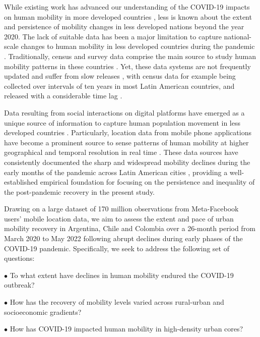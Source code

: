 \documentclass[fleqn,10pt]{wlscirep}
\begin{document}
While existing work has advanced our understanding of the COVID-19 impacts on human mobility in more developed countries \cite{gonzález-leonardo2022b, roweCalafiore2022, rowe2023, wang2022}, less is known about the extent and persistence of mobility changes in less developed nations beyond the year 2020. The lack of suitable data has been a major limitation to capture national-scale changes to human mobility in less developed countries during the pandemic \cite{ RoweCCA24}. Traditionally, census and survey data comprise the main source to study human mobility patterns in these countries \cite{bell2014}. Yet, these data systems are not frequently updated and suffer from slow releases \cite{rowe2023big, Cabrera-Arnau2023}, with census data for example being collected over intervals of ten years in most Latin American countries, and released with a considerable time lag \cite{bell2014}. 

Data resulting from social interactions on digital platforms have emerged as a unique source of information to capture human population movement in less developed countries \cite{rowe2023big}. Particularly, location data from mobile phone applications have become a prominent source to sense patterns of human mobility at higher geographical and temporal resolution in real time \cite{calafiore2023, iradukunda2025}. These data sources have consistently documented the sharp and widespread mobility declines during the early months of the pandemic across Latin American cities \cite{RoweCCA24, covidMexico24, elejalde2024, demography25}, providing a well-established empirical foundation for focusing on the persistence and inequality of the post-pandemic recovery in the present study.

Drawing on a large dataset of 170 million observations from Meta-Facebook users' mobile location data, we aim to assess the extent and pace of urban mobility recovery in Argentina, Chile and Colombia over a 26-month period from March 2020 to May 2022 following abrupt declines during early phases of the COVID-19 pandemic. Specifically, we seek to address the following set of questions:

$\bullet$ To what extent have declines in human mobility endured the COVID-19 outbreak? 
 
$\bullet$ How has the recovery of mobility levels varied across rural-urban and socioeconomic gradients?

$\bullet$ How has COVID-19 impacted human mobility in high-density urban cores?
\end{document}
